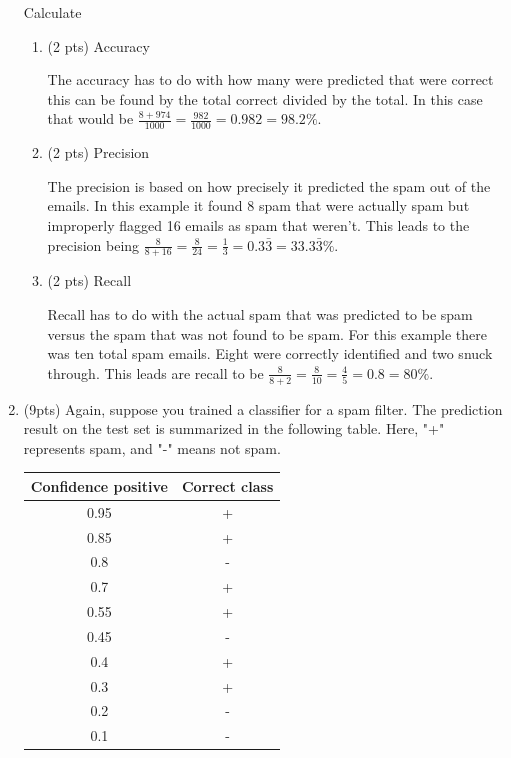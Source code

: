 \documentclass[a4paper]{article}
\theoremstyle{definition}
\newenvironment{soln}{
    \leavevmode\color{blue}\ignorespaces
}{}
\begin{document}
\begin{enumerate}
Calculate
\begin{enumerate}
	\item (2 pts) Accuracy\\
    	\begin{soln}
                The accuracy has to do with how many were predicted that were correct this can be found by the total correct divided by the total. In this case that would be $\frac{8+974}{1000} = \frac{982}{1000} = 0.982 = 98.2\%$.
            \end{soln}
	\item (2 pts) Precision\\
            \begin{soln}
                The precision is based on how precisely it predicted the spam out of the emails. In this example it found 8 spam that were actually spam but improperly flagged 16 emails as spam that weren't. This leads to the precision being $\frac{8}{8+16} = \frac{8}{24} = \frac{1}{3} = 0.3\bar{3} = 33.3\bar{3}\%$.
            \end{soln}
	\item (2 pts) Recall\\
		\begin{soln}
                Recall has to do with the actual spam that was predicted to be spam versus the spam that was not found to be spam. For this example there was ten total spam emails. Eight were correctly identified and two snuck through. This leads are recall to be $\frac{8}{8+2} = \frac{8}{10} = \frac{4}{5} = 0.8 = 80\%$.
            \end{soln}
\end{enumerate}


\item (9pts) Again, suppose you trained a classifier for a spam filter. The prediction result on the test set is summarized in the following table. Here, "+" represents spam, and "-" means not spam.

\begin{center}
\begin{tabular}{ c  c }
\hline
Confidence positive & Correct class \\ \hline
0.95 & + \\
0.85 & + \\
0.8 & - \\
0.7 & + \\
0.55 & + \\
0.45 & - \\
0.4 & + \\
0.3 & + \\
0.2 & - \\
0.1 & - \\
\hline
\end{tabular}
\end{center}


\end{enumerate}
\end{document}
